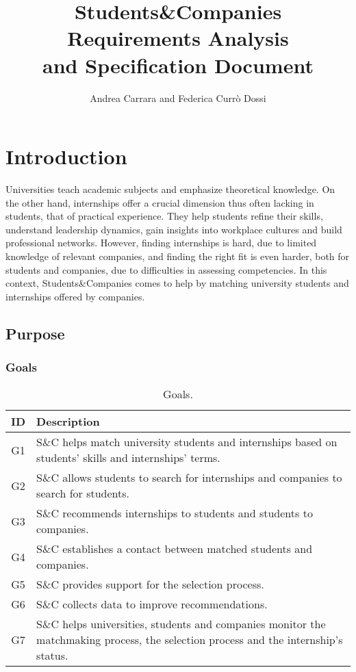 \documentclass[a4paper, oneside]{book}
\title{
    Students\&Companies \\
    \Huge Requirements Analysis \\
    and Specification Document
}
\author{Andrea Carrara and Federica Currò Dossi}
\begin{document}
\maketitle

\tableofcontents

\chapter{Introduction}
Universities teach academic subjects and emphasize theoretical knowledge.
On the other hand, internships offer a crucial dimension thus often lacking in students, that of practical experience.
They help students refine their skills, understand leadership dynamics, gain insights into workplace cultures and build professional networks.
However, finding internships is hard, due to limited knowledge of relevant companies, and finding the right fit is even harder, both for students and companies, due to difficulties in assessing competencies.
In this context, Students\&Companies comes to help by matching university students and internships offered by companies.

\section{Purpose}
\subsection{Goals}
\begin{table}[h]
\renewcommand{\arraystretch}{1.5}
\begin{tabular}{|c|p{10.5 cm}|}
    \hline
    \textbf{ID} & \textbf{ Description} \\ \hline \hline
    G1 & S\&C helps match university students and internships based on students' skills and internships' terms. \\ \hline
    G2 & S\&C allows students to search for internships and companies to search for students. \\ \hline
    G3 & S\&C recommends internships to students and students to companies. \\ \hline
    G4 & S\&C establishes a contact between matched students and companies. \\ \hline
    G5 & S\&C provides support for the selection process. \\ \hline
    G6 & S\&C collects data to improve recommendations. \\ \hline
    G7 & S\&C helps universities, students and companies monitor the matchmaking process, the selection process and the internship's status. \\ \hline
\end{tabular}
\caption{Goals.}
\end{table}
\end{document}
